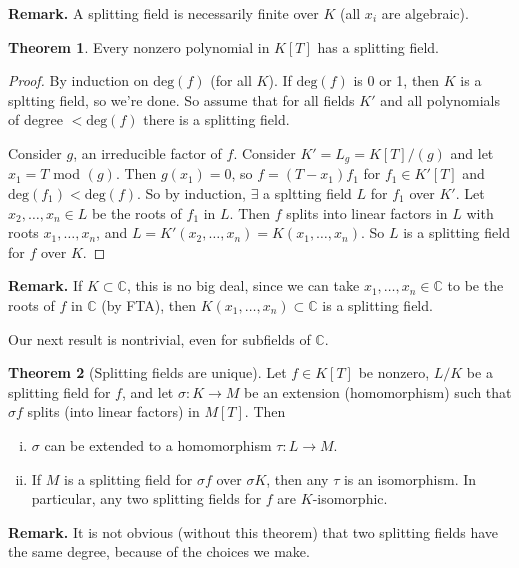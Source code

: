 \documentclass{article}
\theoremstyle{definition}
\newtheorem{theorem}{Theorem}[section]
\begin{document}
\textbf{Remark.} A splitting field is necessarily finite over $K$ (all $x_i$ are algebraic).
\begin{theorem}\label{6.6}
    Every nonzero polynomial in $K[T]$ has a splitting field.
\end{theorem}
\begin{proof}
    By induction on $\text{deg}(f)$ (for all $K$). If $\text{deg}(f)$ is 0 or 1, then $K$ is a spltting field, so we're done. So assume that for all fields $K'$ and all polynomials of degree $<\text{deg}(f)$ there is a splitting field.
    \vspace{1mm}
    
    Consider $g$, an irreducible factor of $f$. Consider $K' = L_g = K[T]/(g)$ and let $x_1 = T$ mod $(g)$. Then $g(x_1)=0$, so $f = (T-x_1)f_1$ for $f_1 \in K'[T]$ and $\text{deg}(f_1)<\text{deg}(f)$. So by induction, $\exists$ a spltting field $L$ for $f_1$ over $K'$. Let $x_2,\ldots,x_n \in L$ be the roots of $f_1$ in $L$. Then $f$ splits into linear factors in $L$ with roots $x_1,\ldots,x_n$, and $L=K'(x_2,\ldots,x_n) = K(x_1,\ldots,x_n)$. So $L$ is a splitting field for $f$ over $K$.
\end{proof}


\vspace{1mm}

\textbf{Remark.} If $K \subset \mathbb{C}$, this is no big deal, since we can take $x_1,\ldots,x_n \in \mathbb{C}$ to be the roots of $f$ in $\mathbb{C}$ (by FTA), then $K(x_1,\ldots,x_n) \subset \mathbb{C}$ is a splitting field.
\vspace{1mm}

Our next result is nontrivial, even for subfields of $\mathbb{C}$.
\begin{theorem}[Splitting fields are unique]
    Let $f \in K[T]$ be nonzero, $L/K$ be a splitting field for $f$, and let $\sigma : K \to M$ be an extension (homomorphism) such that $\sigma f$ splits (into linear factors) in $M[T]$. Then
    \begin{enumerate}[(i)]
        \item $\sigma$ can be extended to a homomorphism $\tau : L \to M$.
        \item If $M$ is a splitting field for $\sigma f$ over $\sigma K$, then any $\tau$ is an isomorphism. In particular, any two splitting fields for $f$ are $K$-isomorphic.
    \end{enumerate}
\end{theorem}
\textbf{Remark.} It is not obvious (without this theorem) that two splitting fields have the same degree, because of the choices we make.
\end{document}
